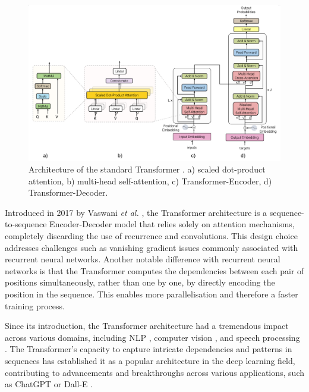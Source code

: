 \begin{figure}[ht]
    \centering
    \includegraphics[width=1\textwidth]{imgs/Transformer_archi.png}
    \caption{Architecture of the standard Transformer \cite{vaswani2017attention}. a) scaled dot-product attention, b) multi-head self-attention, c) Transformer-Encoder, d) Transformer-Decoder.}
    \label{fig:Transformer_archi}
\end{figure}
Introduced in 2017 by Vaswani \textit{et al.} \cite{vaswani2017attention}, the Transformer architecture is a sequence-to-sequence Encoder-Decoder model that relies solely on attention mechanisms, completely discarding the use of recurrence and convolutions. This design choice addresses challenges such as vanishing gradient issues commonly associated with recurrent neural networks. Another notable difference with recurrent neural networks is that the Transformer computes the dependencies between each pair of positions simultaneously, rather than one by one, by directly encoding the position in the sequence. This enables more parallelisation and therefore a faster training process.

Since its introduction, the Transformer architecture had a tremendous impact across various domains, including \ac{NLP} \cite{Bert,brown2020language}, computer vision \cite{dosovitskiy2020image}, and speech processing \cite{dong2018speech}. The Transformer's capacity to capture intricate dependencies and patterns in sequences has established it as a popular architecture in the deep learning field, contributing to advancements and breakthroughs across various applications, such as ChatGPT \cite{bahrini2023chatgpt} or Dall-E \cite{ramesh2021zero}.

